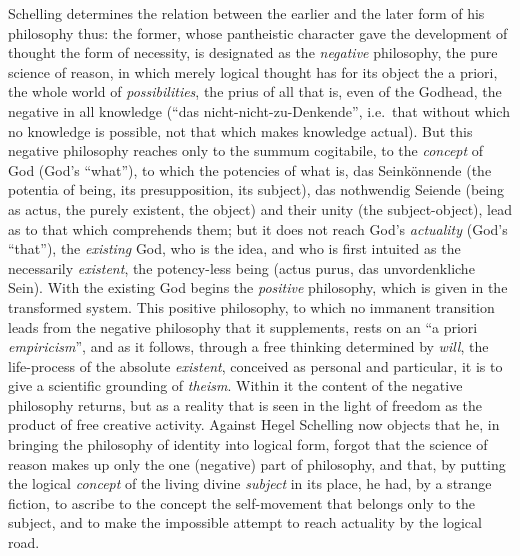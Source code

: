 Schelling determines the relation between the earlier and the later form
of his philosophy thus: the former, whose pantheistic character gave the
development of thought the form of necessity, is designated as the
\emph{negative} philosophy, the pure science of reason, in which merely
logical thought has for its object the a priori, the whole world of
\emph{possibilities}, the prius of all that is, even of the Godhead, the
negative in all knowledge (``das nicht-nicht-zu-Denkende'', i.e.\ that
without which no knowledge is possible, not that which makes knowledge
actual). But this negative philosophy reaches only to the summum
cogitabile, to the \emph{concept} of God (God's ``what''), to which the
potencies of what is, das Seinkönnende (the potentia of being, its
presupposition, its subject), das nothwendig Seiende (being as actus, the
purely existent, the object) and their unity (the subject-object), lead
as to that which comprehends them; but it does not reach God's
\emph{actuality} (God's ``that''), the \emph{existing} God, who is the
idea, and who is first intuited as the necessarily \emph{existent}, the
potency-less being (actus purus, das unvordenkliche Sein). With the
existing God begins the \emph{positive} philosophy, which is given in the
transformed system. This positive philosophy, to which no immanent
transition leads from the negative philosophy that it supplements, rests
on an ``a priori \emph{empiricism}'', and as it follows, through a free
thinking determined by \emph{will}, the life-process of the absolute
\emph{existent}, conceived as personal and particular, it is to give a
scientific grounding of \emph{theism}. Within it the content of the
negative philosophy returns, but as a reality that is seen in the light
of freedom as the product of free creative activity. Against Hegel
Schelling now objects that he, in bringing the philosophy of identity
into logical form, forgot that the science of reason makes up only the
one (negative) part of philosophy, and that, by putting the logical
\emph{concept} of the living divine \emph{subject} in its place, he had,
by a strange fiction, to ascribe to the concept the
self-movement that belongs only to the subject, and to make the
impossible attempt to reach actuality by the logical road.

